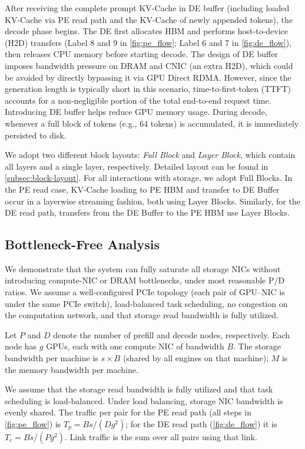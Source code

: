  After receiving the complete prompt KV-Cache in DE buffer (including loaded KV-Cache via PE read path and the KV-Cache of newly appended tokens), the decode phase begins.
The DE first allocates HBM and performs host-to-device (H2D) transfers (Label 8 and 9 in \autoref{fig:pe_flow}; Label 6 and 7 in \autoref{fig:de_flow}), then releases CPU memory before starting decode.
The design of DE buffer imposes bandwidth pressure on DRAM and CNIC (an extra H2D), which could be avoided by directly bypassing it via GPU Direct RDMA.
However, since the generation length is typically short in this scenario, time-to-first-token (TTFT) accounts for a non-negligible portion of the total end-to-end request time.
Introducing DE buffer helps reduce GPU memory usage.
During decode, whenever a full block of tokens (e.g., 64 tokens) is accumulated, it is immediately persisted to disk.

We adopt two different block layouts: \emph{Full Block} and \emph{Layer Block}, which contain all layers and a single layer, respectively.
Detailed layout can be found in \autoref{subsec:block-layout}.
For all interactions with storage, we adopt Full Blocks.
In the PE read case, KV-Cache loading to PE HBM and transfer to DE Buffer occur in a layerwise streaming fashion, both using Layer Blocks.
Similarly, for the DE read path, transfers from the DE Buffer to the PE HBM use Layer Blocks.




\subsection{Bottleneck-Free Analysis}
\label{subsec:bottle-free-analysis}
We demonstrate that the system can fully saturate all storage NICs without introducing compute-NIC or DRAM bottlenecks, under most reasonable P/D ratios.
We assume a well-configured PCIe topology (each pair of GPU--NIC is under the same PCIe switch), load-balanced task scheduling, no congestion on the computation network, and that storage read bandwidth is fully utilized.

 Let $P$ and $D$ denote the number of prefill and decode nodes, respectively. Each node has $g$ GPUs, each with one compute NIC of bandwidth $B$. The storage bandwidth per machine is $s \times B$ (shared by all engines on that machine); $M$ is the memory bandwidth per machine.

 We assume that the storage read bandwidth is fully utilized and that task scheduling is load-balanced. Under load balancing, storage NIC bandwidth is evenly shared. The traffic per pair for the PE read path (all steps in \autoref{fig:pe_flow}) is $T_p = Bs/(Dg^2)$; for the DE read path (\autoref{fig:de_flow}) it is $T_c = Bs/(Pg^2)$. Link traffic is the sum over all pairs using that link.



